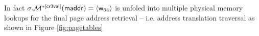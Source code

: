 In fact $\sigma.\mathcal{M}^{*[\mathsf{cr3val}]}(\mathsf{maddr})=\langle\mathsf{w}_{64}\rangle$ is unfoled into multiple physical memory lookups for the final page address retrieval -- i.e. address translation traversal as shown in Figure \ref{fig:pagetables}  


